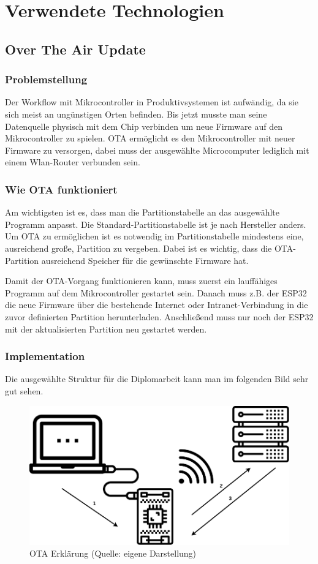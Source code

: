 \chapter{Verwendete Technologien}\label{cha:used-technologies}

\section{Over The Air Update}\label{sec:ota}

\subsection*{Problemstellung}\label{sec:problem}
Der Workflow mit Mikrocontroller in Produktivsystemen ist aufwändig, da sie sich meist an ungünstigen Orten befinden. 
Bis jetzt musste man seine Datenquelle physisch mit dem Chip verbinden um neue Firmware auf den Mikrocontroller zu spielen. 
OTA ermöglicht es den Mikrocontroller mit neuer Firmware zu versorgen, dabei muss der ausgewählte Microcomputer lediglich mit einem Wlan-Router verbunden sein. 

\subsection*{Wie OTA funktioniert}
Am wichtigsten ist es, dass man die Partitionstabelle an das ausgewählte Programm anpasst. 
Die Standard-Partitionstabelle ist je nach Hersteller anders. Um OTA zu ermöglichen ist es notwendig im Partitionstabelle mindestens eine, ausreichend große, Partition zu vergeben. Dabei ist es wichtig, dass die OTA-Partition ausreichend Speicher für die gewünschte Firmware hat.

Damit der OTA-Vorgang funktionieren kann, muss zuerst ein lauffähiges Programm auf dem Mikrocontroller gestartet sein. Danach muss z.B. der ESP32 die neue Firmware über die bestehende Internet oder Intranet-Verbindung in die zuvor definierten Partition herunterladen. Anschließend muss nur noch der ESP32 mit der aktualisierten Partition neu gestartet werden. 

\subsection*{Implementation}
Die ausgewählte Struktur für die Diplomarbeit kann man im folgenden Bild sehr gut sehen.

\begin{figure}[H]
    \begin{center}
        \includegraphics[scale=.5]{images/ota-explanation.png}
        \caption{OTA Erklärung (Quelle: eigene Darstellung)}
    \end{center}    
\end{figure}
